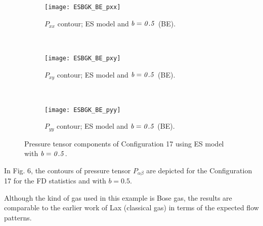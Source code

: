 \documentclass{rsproca}%
\begin{document}
\begin{figure}
        \centering
        \begin{subfigure}[b]{0.32\textwidth}
                \centering
                \texttt{[image: ESBGK\_BE\_pxx]}
                \caption{$P_{xx}$ contour; ES model and $\it{b=0.5}$ (BE).}
                \label{fig:ESBGK_BE_pxx}
        \end{subfigure}%
        ~ %
        \begin{subfigure}[b]{0.32\textwidth}
                \centering
                \texttt{[image: ESBGK\_BE\_pxy]}
                \caption{$P_{xy}$ contour; ES model and $\it{b=0.5}$ (BE).}
                \label{fig:ESBGK_BE_pxy}
        \end{subfigure}
        ~ %
        \begin{subfigure}[b]{0.32\textwidth}
                \centering
                \texttt{[image: ESBGK\_BE\_pyy]}
                \caption{$P_{yy}$ contour; ES model and $\it{b=0.5}$ (BE).}
                \label{fig:ESBGK_BE_pyy}
        \end{subfigure}
        \caption{Pressure tensor components of Configuration 17 using ES model with $\it{b=0.5}$.}\label{fig:conf5_pTensor_BE}
\end{figure}
In Fig. 6, the contours of pressure tensor $P_{\alpha \beta}$ are depicted for the Configuration 17 for the FD statistics and with $b=0.5$.

Although the kind of gas used in this example is Bose gas, the results are comparable to the earlier work of Lax \cite{Laxliu95} (classical gas) in terms of the expected flow patterns.
\end{document}
